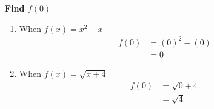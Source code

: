 \documentclass[crop=false,fleqn]{standalone}
\begin{document}
    \textbf{Find $f(0)$}

    \begin{enumerate}
        \item When $f(x) = x^2 - x$
        \begin{align*}
            f(0) &= (0)^2 - (0) \\
                &= 0
        \end{align*}

        \item When $f(x) = \sqrt{x + 4}$
        \begin{align*}
            f(0) &= \sqrt{0 + 4} \\
                &= \sqrt{4}
        \end{align*}
    \end{enumerate}
\end{document}
